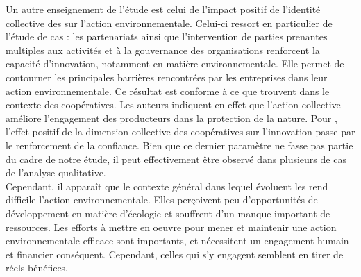         Un autre enseignement de l'étude est celui de l'impact positif de l'identité collective des \oess sur l'action environnementale. Celui-ci ressort en particulier de l'étude de cas : les partenariats ainsi que l'intervention de parties prenantes multiples aux activités et à la gouvernance des organisations renforcent la capacité d'innovation, notamment en matière environnementale. Elle permet de contourner les principales barrières rencontrées par les entreprises dans leur action environnementale. Ce résultat est conforme à ce que trouvent \textcite{mojo2015social} dans le contexte des coopératives. Les auteurs indiquent en effet que l'action collective améliore l'engagement des producteurs dans la protection de la nature. Pour \textcite{musson2018les}, l'effet positif de la dimension collective des coopératives sur l'innovation passe par le renforcement de la confiance. Bien que ce dernier paramètre ne fasse pas partie du cadre de notre étude, il peut effectivement être observé dans plusieurs de cas de l'analyse qualitative. \\


        Cependant, il apparaît que le contexte général dans lequel évoluent les \oess rend difficile l'action environnementale. Elles perçoivent peu d'opportunités de développement en matière d'écologie et souffrent d'un manque important de ressources. Les efforts à mettre en oeuvre pour mener et maintenir une action environnementale efficace sont importants, et nécessitent un engagement humain et financier conséquent. Cependant, celles qui s'y engagent semblent en tirer de réels bénéfices.


